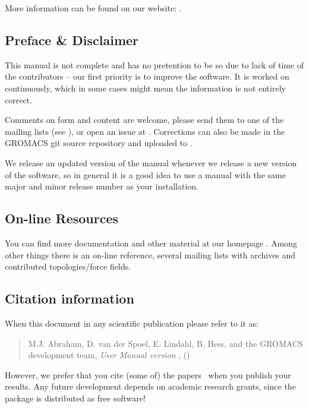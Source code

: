 \documentclass[11pt,a4paper,twoside]{gmxmanual}
\begin{document}
More information can be found on our website: {\wwwpage}.


\newpage
\pagestyle{fancyplain}

\subsection*{Preface \& Disclaimer}
This manual is not complete and has no pretention to be so due
to lack of time of the contributors -- our first priority is to improve
the software. It is worked on continuously,
which in some cases might mean the information is not entirely correct.

Comments on form and content are welcome, please send them to one of
the mailing lists (see {\wwwpage}), or open an issue
at {\redminepage}. Corrections can also be made in the GROMACS git
source repository and uploaded to {\gerritpage}.

We release an updated version of the manual whenever
we release a new version of the software, so in general 
it is a good idea to use a manual with the same major and
minor release number as your {\gromacs} installation. 

\subsection*{On-line Resources}
You can find more documentation and other material at our homepage
\wwwpage. Among other things there is an on-line reference, several
{\gromacs} mailing lists with archives and contributed
topologies/force fields.

\subsection*{Citation information}
When  this document in any scientific publication
please refer to it as:
\begin{quote}
\raggedright
M.J. Abraham, D. van der Spoel, E. Lindahl, B. Hess, and the GROMACS development team,
\hspace{0.3em} {\em {\gromacs} {U}ser {M}anual version \gmxver},
\hspace{0.3em} {\wwwpage} ({\gmxyear})
\end{quote}
However, we prefer that you cite (some of) the {\gromacs}
papers~\cite{Bekker93a,Berendsen95a,Lindahl2001a,Spoel2005a,Hess2008b,Pronk2013,Pall2015,Abraham2015}
when you publish your results. Any future development depends on academic research
grants, since the package is distributed as free software!
\end{document}
